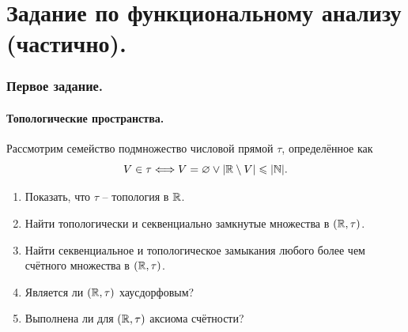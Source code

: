 \part{Задание по функциональному анализу (частично).}
\section{Первое задание.}
\subsection{Топологические пространства.}
\begin{task}[T1]
    Рассмотрим семейство подмножество числовой прямой $\tau$, определённое как
    \[
        V \in \tau \Longleftrightarrow V = \varnothing \vee |\mathbb{R} \setminus V| \leqslant |\mathbb{N}|.
    \]
    \begin{enumerate}
        \item Показать, что $\tau$ -- топология в $\mathbb{R}$.
        \item Найти топологически и секвенциально замкнутые множества в $(\mathbb{R}, \tau)$.
        \item Найти секвенциальное и топологическое замыкания любого более чем счётного множества в $(\mathbb{R}, \tau)$.
        \item Является ли $(\mathbb{R}, \tau)$ хаусдорфовым?
        \item Выполнена ли для $(\mathbb{R}, \tau)$ аксиома счётности?
    \end{enumerate}
\end{task}
